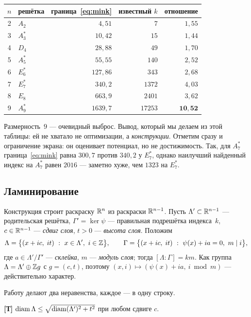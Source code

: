 \begin{center}\small
\begin{tabular}{c l r r r}
\toprule
$n$ & решётка & граница~\eqref{eq:mink} & известный $k$ & отношение\\
\midrule
2 & $A_2$    & $4{,}51$   & $7$     & $1{,}55$\\
3 & $A_3^*$  & $10{,}42$  & $15$    & $1{,}44$\\
4 & $D_4$    & $28{,}88$  & $49$    & $1{,}70$\\
5 & $A_5^*$  & $55{,}55$  & $140$   & $2{,}52$\\
6 & $E_6^*$  & $127{,}86$ & $343$   & $2{,}68$\\
7 & $E_7^*$  & $340{,}2$  & $1372$  & $4{,}03$\\
8 & $E_8$    & $663{,}9$  & $2401$  & $3{,}62$\\
9 & $A_9^*$  & $1639{,}7$ & $17253$ & $\mathbf{10{,}52}$\\
\bottomrule
\end{tabular}
\end{center}

\noindent Размерность~$9$ --- очевидный выброс. Вывод, который мы делаем из
этой таблицы: ей не хватало не оптимизации, а \emph{конструкции}. Отметим сразу
и ограничение экрана: он оценивает потенциал, но не достижимость. Так, для
$A_7^*$ граница~\eqref{eq:mink} равна $300{,}7$ против $340{,}2$ у $E_7^*$,
однако наилучший найденный индекс на $A_7^*$ равен $2016$ --- заметно хуже, чем
$1323$ на $E_7^*$.

\subsection{Ламинирование}\label{ssec:lam}

Конструкция строит раскраску $\mathbb{R}^n$ из раскраски $\mathbb{R}^{n-1}$. Пусть
$\Lambda'\subset\mathbb{R}^{n-1}$ --- родительская решётка, $\Gamma'=\ker\psi$ ---
правильная подрешётка индекса~$k$, $c\in\mathbb{R}^{n-1}$ --- \emph{сдвиг слоя},
$t>0$ --- \emph{высота слоя}. Положим
\[
\Lambda=\bigl\{(x+ic,\;it)\ :\ x\in\Lambda',\ i\in\Z\bigr\},\qquad
\Gamma=\bigl\{(x+ic,\;it)\ :\ \psi(x)+ia=0,\ m\mid i\bigr\},
\]
где $a\in\Lambda'/\Gamma'$ --- \emph{склейка}, $m$ --- \emph{модуль слоя};
тогда $[\Lambda:\Gamma]=km$. Как группа $\Lambda=\Lambda'\oplus\mathbb{Z} g$ с
$g=(c,t)$, поэтому $(x,i)\mapsto(\psi(x)+ia,\ i\bmod m)$ --- действительно
характер.

Работу делают два неравенства, каждое --- в одну строку.

\begin{lemma}\label{lem:P1}
\textbf{[Т]} $\operatorname{diam}\Lambda\le\sqrt{\operatorname{diam}(\Lambda')^2+t^2}$ при любом сдвиге $c$.
\end{lemma}

